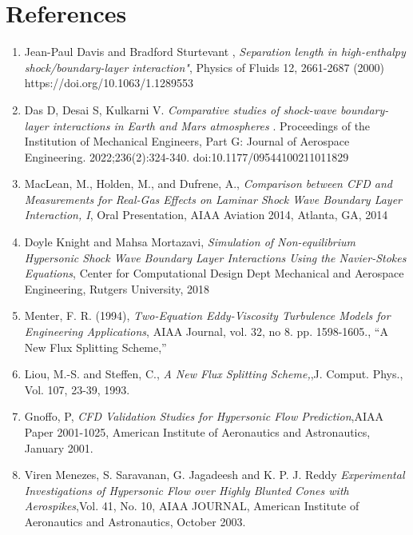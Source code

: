 \section{References}
\begin{enumerate}
  \item Jean-Paul Davis and Bradford Sturtevant , \emph{Separation length in high-enthalpy shock/boundary-layer interaction"}, Physics of Fluids 12, 2661-2687 (2000) https://doi.org/10.1063/1.1289553 
  \item Das D, Desai S, Kulkarni V. \emph{Comparative studies of shock-wave boundary-layer interactions in Earth and Mars atmospheres} . Proceedings of the Institution of Mechanical Engineers, Part G: Journal of Aerospace Engineering. 2022;236(2):324-340. doi:10.1177/09544100211011829
  \item MacLean, M., Holden, M., and Dufrene, A., \emph{Comparison between CFD and Measurements for Real-Gas Effects on Laminar Shock Wave Boundary Layer Interaction, I}, Oral Presentation, AIAA Aviation 2014, Atlanta, GA, 2014
  \item Doyle Knight and Mahsa Mortazavi, \emph{Simulation of Non-equilibrium Hypersonic Shock Wave Boundary
    Layer Interactions Using the Navier-Stokes Equations}, Center for Computational Design
    Dept Mechanical and Aerospace Engineering, Rutgers University, 2018
     \item Menter, F. R. (1994), \emph{Two-Equation Eddy-Viscosity Turbulence Models for Engineering Applications}, AIAA Journal, vol. 32, no 8. pp. 1598-1605., “A New Flux Splitting Scheme,” 
       \item Liou, M.-S. and Steffen, C., \emph{A New Flux Splitting Scheme,},J. Comput. Phys., Vol. 107, 23-39, 1993.
            \item Gnoffo, P, \emph{CFD Validation Studies for Hypersonic Flow Prediction},AIAA Paper 2001-1025, American Institute of Aeronautics and Astronautics, January 2001.
 \item Viren Menezes, S. Saravanan, G. Jagadeesh and K. P. J. Reddy \emph{Experimental Investigations of Hypersonic Flow
over Highly Blunted Cones with Aerospikes},Vol. 41, No. 10, AIAA JOURNAL, American Institute of Aeronautics and Astronautics, October 2003.
            
\end{enumerate}